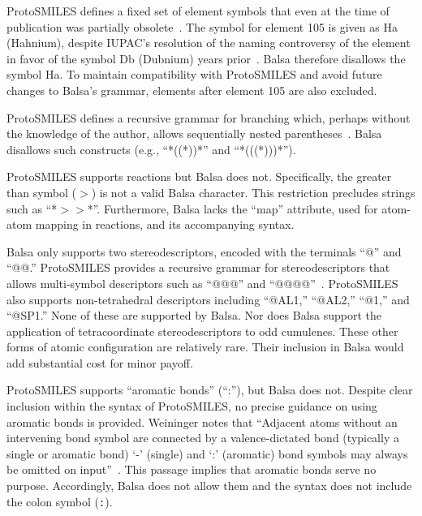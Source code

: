 \documentclass{article}
\def\ttt{\texttt}
\begin{document}
ProtoSMILES defines a fixed set of element symbols that even at the time of publication was partially obsolete~\cite[p.~83]{weininger:2003}. The symbol for element 105 is given as Ha (Hahnium), despite IUPAC's resolution of the naming controversy of the element in favor of the symbol Db (Dubnium) years prior~\cite{sageson:1997}. Balsa therefore disallows the symbol Ha. To maintain compatibility with ProtoSMILES and avoid future changes to Balsa's grammar, elements after element 105 are also excluded.

ProtoSMILES defines a recursive grammar for branching which, perhaps without the knowledge of the author, allows sequentially nested parentheses~\cite[p.~86]{weininger:2003}. Balsa disallows such constructs (e.g., \enquote{*((*))*} and \enquote{*(((*)))*}).

ProtoSMILES supports reactions but Balsa does not. Specifically, the greater than symbol (\ttt{$>$}) is not a valid Balsa character. This restriction precludes strings such as \enquote{*$>$$>$*}. Furthermore, Balsa lacks the \enquote{map} attribute, used for atom-atom mapping in reactions, and its accompanying syntax.

Balsa only supports two stereodescriptors, encoded with the terminals \enquote{@} and \enquote{@@.} ProtoSMILES provides a recursive grammar for stereodescriptors that allows multi-symbol descriptors such as \enquote{@@@} and \enquote{@@@@}~\cite[p.~94]{weininger:2003}. ProtoSMILES also supports non-tetrahedral descriptors including \enquote{@AL1,} \enquote{@AL2,} \enquote{@1,} and \enquote{@SP1.} None of these are supported by Balsa. Nor does Balsa support the application of tetracoordinate stereodescriptors to odd cumulenes. These other forms of atomic configuration are relatively rare. Their inclusion in Balsa would add substantial cost for minor payoff.

ProtoSMILES supports \enquote{aromatic bonds} (\enquote{:}), but Balsa does not. Despite clear inclusion within the syntax of ProtoSMILES, no precise guidance on using aromatic bonds is provided. Weininger notes that \enquote{Adjacent atoms without an intervening bond symbol are connected by a valence-dictated bond (typically a single or aromatic bond) \enquote{-} (single) and \enquote{:} (aromatic) bond symbols may always be omitted on input}~\cite[p.~85]{weininger:2003}. This passage implies that aromatic bonds serve no purpose. Accordingly, Balsa does not allow them and the syntax does not include the colon symbol (\ttt{:}).

\end{document}
